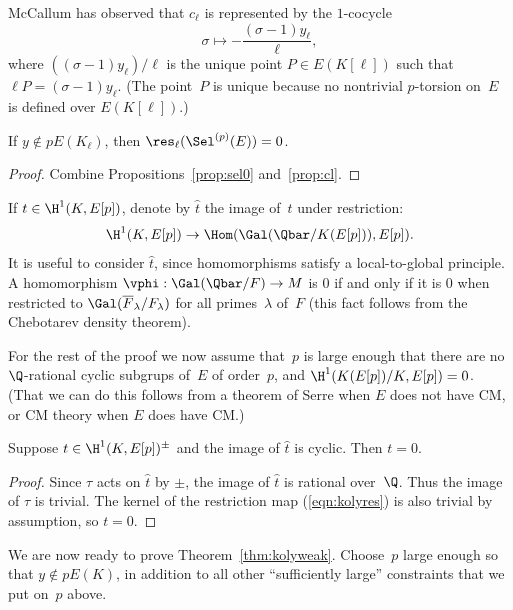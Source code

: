 \documentclass{report}
\begin{document}
\begin{remark}
McCallum has observed that $c_\ell$ is represented by the
$1$-cocycle
$$
  \sigma\mapsto - \frac{(\sigma-1)y_\ell}{\ell},
$$
where $((\sigma-1)y_\ell)/\ell$ is the unique point $P\in E(K[\ell])$
such that $\ell P = (\sigma-1)y_\ell$.  (The point~$P$ is unique
because no nontrivial $p$-torsion on~$E$ is defined over
$E(K[\ell])$.)
\end{remark}

\begin{corollary}\label{cor:alsokillsel}
If $y\not\in p E(K_\ell)$, then $\res_\ell(\Sel^{(p)}(E))=0$.
\end{corollary}
\begin{proof}
Combine Propositions~\ref{prop:sel0} and~\ref{prop:cl}.
\end{proof}

\renewcommand{\th}{\hat{t}}
If $t\in \H^1(K,E[p])$, denote by $\th$ the image
of~$t$ under restriction:
\begin{equation}\label{eqn:kolyres}
\H^1(K,E[p]) \to \Hom(\Gal(\Qbar/K(E[p])), E[p]).
\end{equation}
It is useful to consider $\th$, since homomorphisms satisfy a
local-to-global principle.  A homomorphism $\vphi:\Gal(\Qbar/F)\to M$
is $0$ if and only if it is $0$ when restricted to
$\Gal(\overline{F}_\lambda/F_\lambda)$ for all primes~$\lambda$ of~$F$
(this fact follows from the Chebotarev density theorem).

For the rest of the proof we now assume that~$p$ is large enough that
there are no $\Q$-rational cyclic subgrups of~$E$ of order~$p$, and
$\H^1(K(E[p])/K,E[p])=0$.  (That we can do this follows from a theorem
of Serre when $E$ does not have CM, or CM theory when $E$ does have
CM.)
\begin{lemma}\label{lem:killt}
Suppose $t \in \H^1(K,E[p])^{\pm}$ and the image of $\th$ is cyclic.
Then $t=0$.
\end{lemma}
\begin{proof}
Since $\tau$ acts on $\th$ by $\pm$, the image of $\th$ is rational over~$\Q$.
Thus the image of $\tau$ is trivial.  The kernel of the restriction map
(\ref{eqn:kolyres}) is also trivial by assumption, so $t=0$.
\end{proof}

We are now ready to prove Theorem~\ref{thm:kolyweak}.  Choose~$p$
large enough so that $y\not \in p E(K)$, in addition to all other
``sufficiently large'' constraints that we put on~$p$ above.

\newcommand{\sh}{\hat{s}}
\newcommand{\yh}{\hat{y}}
\end{document}
